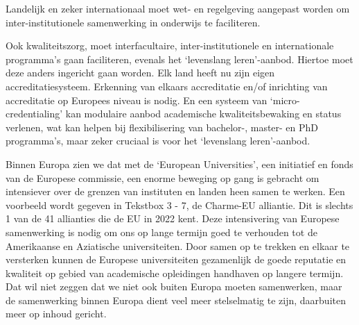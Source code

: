 \documentclass{jote-book}
\begin{document}
	Landelijk en zeker internationaal moet wet- en regelgeving aangepast worden om inter-institutionele samenwerking in onderwijs te faciliteren.



	Ook kwaliteitszorg, moet interfacultaire, inter-institutionele en internationale programma's gaan faciliteren, evenals het ‘levenslang leren'-aanbod. Hiertoe moet deze anders ingericht gaan worden. Elk land heeft nu zijn eigen accreditatiesysteem. Erkenning van elkaars accreditatie en/of inrichting van accreditatie op Europees niveau is nodig. En een systeem van ‘micro-credentialing' kan modulaire aanbod academische kwaliteitsbewaking en status verlenen, wat kan helpen bij flexibilisering van bachelor-, master- en PhD programma's, maar zeker cruciaal is voor het ‘levenslang leren'-aanbod.



	Binnen Europa zien we dat met de ‘European Universities', een initiatief en fonds van de Europese commissie, een enorme beweging op gang is gebracht om intensiever over de grenzen van instituten en landen heen samen te werken. Een voorbeeld wordt gegeven in Tekstbox 3 - 7, de Charme-EU alliantie. Dit is slechts 1 van de 41 allianties die de EU in 2022 kent. Deze intensivering van Europese samenwerking is nodig om ons op lange termijn goed te verhouden tot de Amerikaanse en Aziatische universiteiten. Door samen op te trekken en elkaar te versterken kunnen de Europese universiteiten gezamenlijk de goede reputatie en kwaliteit op gebied van academische opleidingen handhaven op langere termijn. Dat wil niet zeggen dat we niet ook buiten Europa moeten samenwerken, maar de samenwerking binnen Europa dient veel meer stelselmatig te zijn, daarbuiten meer op inhoud gericht.
\end{document}
